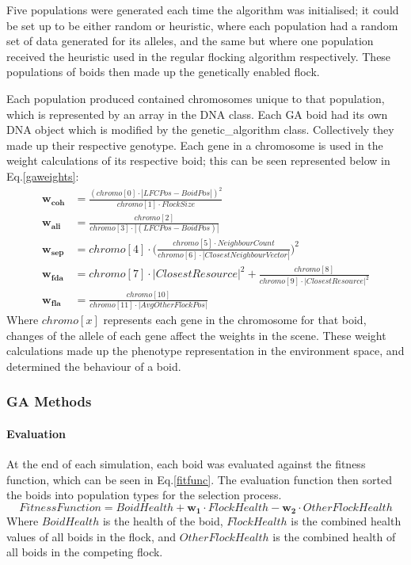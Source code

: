 Five populations were generated each time the algorithm was initialised; it could be set up to be either random or heuristic, where each population had a random set of data generated for its alleles, and the same but where one population received the heuristic used in the regular flocking algorithm respectively. These populations of boids then made up the genetically enabled flock. 

Each population produced contained chromosomes unique to that population, which is represented by an array in the DNA class. Each GA boid had its own DNA object which is modified by the genetic\_algorithm class. Collectively they made up their respective genotype. Each gene in a chromosome is used in the weight calculations of its respective boid; this can be seen represented below in Eq.\ref{gaweights}:
\begin{equation}
\begin{split}
\boldsymbol{w_{coh}} &= \frac{(chromo[0] \cdot |LFCPos - BoidPos|)^2} {chromo[1] \cdot FlockSize} \\
\boldsymbol{w_{ali}} &= \frac{chromo[2]} {chromo[3] \cdot |(LFCPos - BoidPos)|} \\
\boldsymbol{w_{sep}} &= chromo[4] \cdot \Big(\frac{chromo[5] \cdot NeighbourCount} {chromo[6] \cdot |ClosestNeighbourVector|}\Big)^2 \\
\boldsymbol{w_{fda}} &= chromo[7] \cdot |ClosestResource|^2 + \frac{chromo[8]} {chromo[9] \cdot |ClosestResource|^2} \\
\boldsymbol{w_{fla}} &= \frac{chromo[10]} {chromo[11] \cdot |AvgOtherFlockPos|} 
\end{split}
\label{gaweights}
\end{equation}
Where $chromo[x]$ represents each gene in the chromosome for that boid, changes of the allele of each gene affect the weights in the scene.
These weight calculations made up the phenotype representation in the environment space, and determined the behaviour of a boid. 

\subsubsection{GA Methods}
\paragraph{Evaluation}
At the end of each simulation, each boid was evaluated against the fitness function, which can be seen in Eq.\ref{fitfunc}. The evaluation function then sorted the boids into population types for the selection process. 
\begin{equation}
Fitness Function = BoidHealth + \boldsymbol{w_{1}} \cdot FlockHealth - \boldsymbol{w_{2}} \cdot OtherFlockHealth
\label{fitfunc}
\end{equation}
Where $BoidHealth$ is the health of the boid, $FlockHealth$ is the combined health values of all boids in the flock, and $OtherFlockHealth$ is the combined health of all boids in the competing flock.

